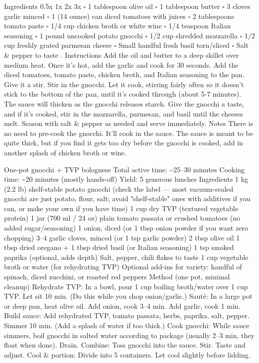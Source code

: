 Ingredients 0.5x 1x 2x 3x {\tiny$\square$} 1 tablespoon olive oil {\tiny$\square$} 1 tablespoon butter {\tiny$\square$} 3 cloves garlic minced {\tiny$\square$} 1 (14 ounce) can diced tomatoes with juices {\tiny$\square$} 2 tablespoons tomato paste {\tiny$\square$} 1/4 cup chicken broth or white wine {\tiny$\square$} 1/4 teaspoon Italian seasoning {\tiny$\square$} 1 pound uncooked potato gnocchi {\tiny$\square$} 1/2 cup shredded mozzarella {\tiny$\square$} 1/2 cup freshly grated parmesan cheese {\tiny$\square$} Small handful fresh basil torn/sliced {\tiny$\square$} Salt \& pepper to taste . Instructions Add the oil and butter to a deep skillet over medium heat. Once it's hot, add the garlic and cook for 30 seconds. Add the diced tomatoes, tomato paste, chicken broth, and Italian seasoning to the pan. Give it a stir. Stir in the gnocchi. Let it cook, stirring fairly often so it doesn't stick to the bottom of the pan, until it's cooked through (about 5-7 minutes). The sauce will thicken as the gnocchi releases starch. Give the gnocchi a taste, and if it's cooked, stir in the mozzarella, parmesan, and basil until the cheeses melt. Season with salt \& pepper as needed and serve immediately. Notes There is no need to pre-cook the gnocchi. It’ll cook in the sauce. The sauce is meant to be quite thick, but if you find it gets too dry before the gnocchi is cooked, add in another splash of chicken broth or wine.
\par

One-pot gnocchi + TVP bolognese Total active time: \~{}25–30 minutes Cooking time: \~{}20 minutes (mostly hands-off) Yield: 5 generous lunches Ingredients 1 kg (2.2 lb) shelf-stable potato gnocchi (check the label — most vacuum-sealed gnocchi are just potato, flour, salt; avoid "shelf-stable" ones with additives if you can, or make your own if you have time) 1 cup dry TVP (textured vegetable protein) 1 jar (700 ml / 24 oz) plain tomato passata or crushed tomatoes (no added sugar/seasoning) 1 onion, diced (or 1 tbsp onion powder if you want zero chopping) 3–4 garlic cloves, minced (or 1 tsp garlic powder) 2 tbsp olive oil 1 tbsp dried oregano + 1 tbsp dried basil (or Italian seasoning) 1 tsp smoked paprika (optional, adds depth) Salt, pepper, chili flakes to taste 1 cup vegetable broth or water (for rehydrating TVP) Optional add-ins for variety: handful of spinach, diced zucchini, or roasted red peppers Method (one pot, minimal cleanup) Rehydrate TVP: In a bowl, pour 1 cup boiling broth/water over 1 cup TVP. Let sit 10 min. (Do this while you chop onion/garlic.) Sauté: In a large pot or deep pan, heat olive oil. Add onion, cook 3–4 min. Add garlic, cook 1 min. Build sauce: Add rehydrated TVP, tomato passata, herbs, paprika, salt, pepper. Simmer 10 min. (Add a splash of water if too thick.) Cook gnocchi: While sauce simmers, boil gnocchi in salted water according to package (usually 2–3 min, they float when done). Drain. Combine: Toss gnocchi into the sauce. Stir. Taste and adjust. Cool \& portion: Divide into 5 containers. Let cool slightly before lidding.
\par
